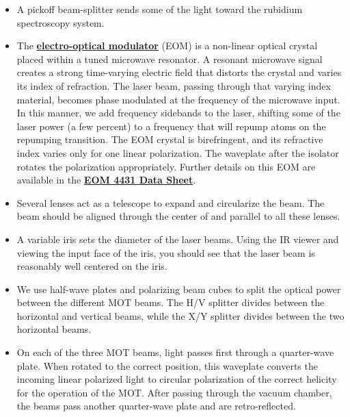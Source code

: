 \documentclass{../lab}
\begin{document}
\begin{itemize}
    \item A pickoff beam-splitter sends some of the light toward the rubidium spectroscopy system.

    \item The \href{http://en.wikipedia.org/wiki/Electro-optic\_modulator}{\textbf{electro-optical modulator}} (EOM) is a non-linear optical crystal placed within a tuned microwave resonator. A resonant microwave signal creates a strong time-varying electric field that distorts the crystal and varies its index of refraction. The laser beam, passing through that varying index material, becomes phase modulated at the frequency of the microwave input. In this manner, we add frequency sidebands to the laser, shifting some of the laser power (a few percent) to a frequency that will repump atoms on the repumping transition. The EOM crystal is birefringent, and its refractive index varies only for one linear polarization. The waveplate after the isolator rotates the polarization appropriately. Further details on this EOM are available in the \href{http://physics111.lib.berkeley.edu/Physics111/Reprints/MOT/Modulators.pdf}{\textbf{EOM 4431 Data Sheet}}.

    \item Several lenses act as a telescope to expand and circularize the beam. The beam should be aligned through the center of and parallel to all these lenses.

    \item A variable iris sets the diameter of the laser beams. Using the IR viewer and viewing the input face of the iris, you should see that the laser beam is reasonably well centered on the iris.

    \item We use half-wave plates and polarizing beam cubes to split the optical power between the different MOT beams. The H/V splitter divides between the horizontal and vertical beams, while the X/Y splitter divides between the two horizontal beams.

    \item On each of the three MOT beams, light passes first through a quarter-wave plate. When rotated to the correct position, this waveplate converts the incoming linear polarized light to circular polarization of the correct helicity for the operation of the MOT. After passing through the vacuum chamber, the beams pass another quarter-wave plate and are retro-reflected.


\end{itemize}
\end{document}
